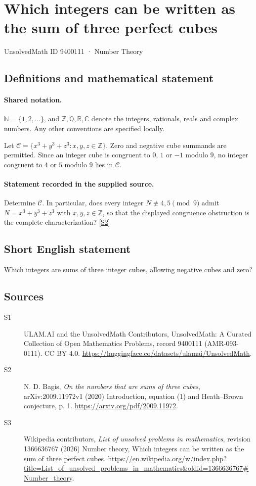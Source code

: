 \documentclass[11pt]{article}
\newcommand{\sref}[2]{\hyperlink{source:#1:#2}{[S#2]}}
\begin{document}
\setcounter{section}{9400110}
\section{Which integers can be written as the sum of three perfect cubes}\label{9400111}
{\small\sffamily UnsolvedMath ID 9400111 · Number Theory}
\subsection{Definitions and mathematical statement}

\paragraph{Shared notation.}$\mathbb N=\{1,2,\ldots\}$, and $\mathbb Z,\mathbb Q,\mathbb R,\mathbb C$ denote the integers, rationals, reals and complex numbers. Any other conventions are specified locally.


Let $\mathcal C=\{x^3+y^3+z^3:x,y,z\in\mathbb Z\}$. Zero and negative cube summands are permitted. Since an integer cube is congruent to $0$, $1$ or $-1$ modulo $9$, no integer congruent to $4$ or $5$ modulo $9$ lies in $\mathcal C$.
\paragraph{Statement recorded in the supplied source.}
Determine $\mathcal C$. In particular, does every integer $N\not\equiv4,5\pmod9$ admit $N=x^3+y^3+z^3$ with $x,y,z\in\mathbb Z$, so that the displayed congruence obstruction is the complete characterization? \sref{9400111}{2}
\subsection{Short English statement}
Which integers are sums of three integer cubes, allowing negative cubes and zero?
\subsection{Sources}
\begin{description}
\item[\hypertarget{source:9400111:1}{S1}] ULAM.AI and the UnsolvedMath Contributors, UnsolvedMath: A Curated Collection of Open Mathematics Problems, record 9400111 (AMR-093-0111). CC BY 4.0. \url{https://huggingface.co/datasets/ulamai/UnsolvedMath}.
\item[\hypertarget{source:9400111:2}{S2}] N. D. Bagis, \emph{On the numbers that are sums of three cubes}, arXiv:2009.11972v1 (2020) Introduction, equation (1) and Heath--Brown conjecture, p. 1. \url{https://arxiv.org/pdf/2009.11972}.
\item[\hypertarget{source:9400111:3}{S3}] Wikipedia contributors, \emph{List of unsolved problems in mathematics}, revision 1366636767 (2026) Number theory, Which integers can be written as the sum of three perfect cubes. \url{https://en.wikipedia.org/w/index.php?title=List_of_unsolved_problems_in_mathematics&oldid=1366636767#Number_theory}.
\end{description}
\label{end:9400111}
\end{document}
